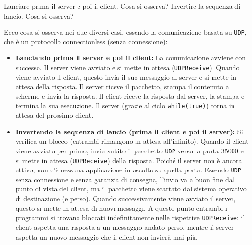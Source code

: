 \documentclass[11pt]{article}
\begin{document}
\begin{tcolorbox}[colback=blue!5!white,colframe=blue!75!black,title=\textbf{DOMANDA}, breakable]
Lanciare prima il server e poi il client. Cosa si osserva? Invertire la sequenza di lancio. Cosa si osserva?
\end{tcolorbox}

\begin{tcolorbox}[colback=green!5!white,colframe=green!75!black,title=\textbf{RISPOSTA}, breakable]
Ecco cosa si osserva nei due diversi casi, essendo la comunicazione basata su \texttt{UDP}, che è un protocollo connectionless (senza connessione):

\begin{itemize}
    \item \textbf{Lanciando prima il server e poi il client:} La comunicazione avviene con successo. Il server viene avviato e si mette in attesa (\texttt{UDPReceive}). Quando viene avviato il client, questo invia il suo messaggio al server e si mette in attesa della risposta. Il server riceve il pacchetto, stampa il contenuto a schermo e invia la risposta. Il client riceve la risposta dal server, la stampa e termina la sua esecuzione. Il server (grazie al ciclo \texttt{while(true)}) torna in attesa del prossimo client.
    
    \item \textbf{Invertendo la sequenza di lancio (prima il client e poi il server):} Si verifica un blocco (entrambi rimangono in attesa all'infinito). Quando il client viene avviato per primo, invia subito il pacchetto \texttt{UDP} verso la porta 35000 e si mette in attesa (\texttt{UDPReceive}) della risposta. Poiché il server non è ancora attivo, non c'è nessuna applicazione in ascolto su quella porta. Essendo \texttt{UDP} senza connessione e senza garanzia di consegna, l'invio va a buon fine dal punto di vista del client, ma il pacchetto viene scartato dal sistema operativo di destinazione (e perso). Quando successivamente viene avviato il server, questo si mette in attesa di nuovi messaggi. A questo punto entrambi i programmi si trovano bloccati indefinitamente nelle rispettive \texttt{UDPReceive}: il client aspetta una risposta a un messaggio andato perso, mentre il server aspetta un nuovo messaggio che il client non invierà mai più.
\end{itemize}
\end{tcolorbox}
\end{document}

